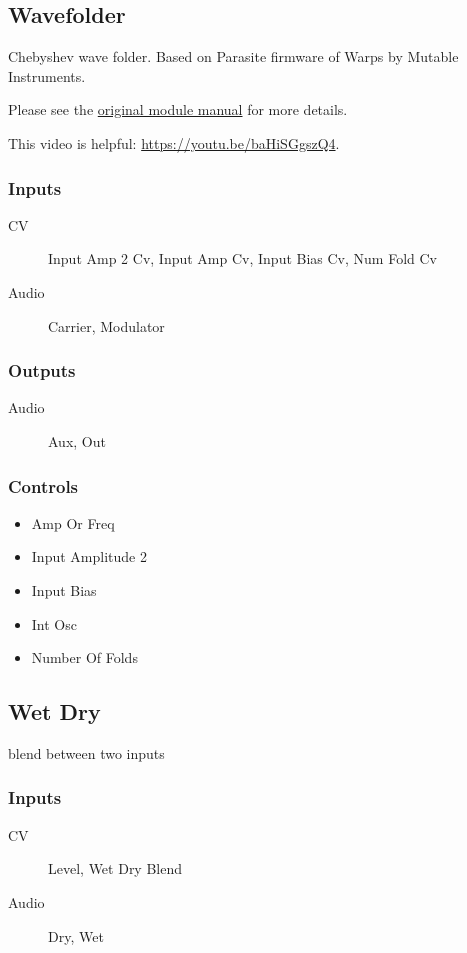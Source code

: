 \subsection{Wavefolder}

Chebyshev wave folder. Based on Parasite firmware of Warps by Mutable Instruments. 



Please see the \href{https://mqtthiqs.github.io/parasites/warps.html}{original module manual} for more details.

This video is helpful: \url{https://youtu.be/baHiSGgszQ4}.

\subsubsection{Inputs}
\begin{description}
\item [CV] Input Amp 2 Cv, Input Amp Cv, Input Bias Cv, Num Fold Cv
\item [Audio] Carrier, Modulator
\end{description}

\subsubsection{Outputs}
\begin{description}
\item [Audio] Aux, Out
\end{description}

\subsubsection{Controls}
\begin{itemize}
\item Amp Or Freq
\item Input Amplitude 2
\item Input Bias
\item Int Osc
\item Number Of Folds
\end{itemize}

\subsection{Wet Dry}

blend between two inputs



\subsubsection{Inputs}
\begin{description}
\item [CV] Level, Wet Dry Blend
\item [Audio] Dry, Wet
\end{description}

